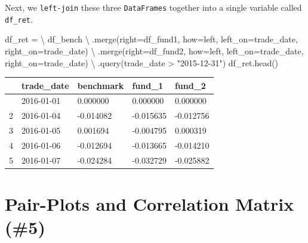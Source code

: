 \documentclass[
  letterpaper,
  DIV=11,
  numbers=noendperiod]{scrreprt}
\newenvironment{Shaded}{\begin{snugshade}}{\end{snugshade}}
\newcommand{\NormalTok}[1]{\textcolor[rgb]{0.00,0.23,0.31}{#1}}
\newcommand{\OperatorTok}[1]{\textcolor[rgb]{0.37,0.37,0.37}{#1}}
\newcommand{\StringTok}[1]{\textcolor[rgb]{0.13,0.47,0.30}{#1}}
\begin{document}
Next, we \texttt{left-join} these three \texttt{DataFrames} together
into a single variable called \texttt{df\_ret}.

\begin{Shaded}
\begin{Highlighting}[]
\NormalTok{df\_ret }\OperatorTok{=} \OperatorTok{\textbackslash{}}
\NormalTok{    df\_bench }\OperatorTok{\textbackslash{}}
\NormalTok{        .merge(right}\OperatorTok{=}\NormalTok{df\_fund1, how}\OperatorTok{=}\StringTok{\textquotesingle{}left\textquotesingle{}}\NormalTok{, left\_on}\OperatorTok{=}\StringTok{\textquotesingle{}trade\_date\textquotesingle{}}\NormalTok{, right\_on}\OperatorTok{=}\StringTok{\textquotesingle{}trade\_date\textquotesingle{}}\NormalTok{) }\OperatorTok{\textbackslash{}}
\NormalTok{        .merge(right}\OperatorTok{=}\NormalTok{df\_fund2, how}\OperatorTok{=}\StringTok{\textquotesingle{}left\textquotesingle{}}\NormalTok{, left\_on}\OperatorTok{=}\StringTok{\textquotesingle{}trade\_date\textquotesingle{}}\NormalTok{, right\_on}\OperatorTok{=}\StringTok{\textquotesingle{}trade\_date\textquotesingle{}}\NormalTok{) }\OperatorTok{\textbackslash{}}
\NormalTok{        .query(}\StringTok{\textquotesingle{}trade\_date \textgreater{} "2015{-}12{-}31"\textquotesingle{}}\NormalTok{)}
\NormalTok{df\_ret.head()}
\end{Highlighting}
\end{Shaded}

\begin{longtable}[]{@{}lllll@{}}
\toprule\noalign{}
& trade\_date & benchmark & fund\_1 & fund\_2 \\
\midrule\noalign{}
\endhead
\bottomrule\noalign{}
\endlastfoot
1 & 2016-01-01 & 0.000000 & 0.000000 & 0.000000 \\
2 & 2016-01-04 & -0.014082 & -0.015635 & -0.012756 \\
3 & 2016-01-05 & 0.001694 & -0.004795 & 0.000319 \\
4 & 2016-01-06 & -0.012694 & -0.013665 & -0.014210 \\
5 & 2016-01-07 & -0.024284 & -0.032729 & -0.025882 \\
\end{longtable}

\hypertarget{pair-plots-and-correlation-matrix-5}{%
\section{Pair-Plots and Correlation Matrix
(\#5)}\label{pair-plots-and-correlation-matrix-5}}
\end{document}
